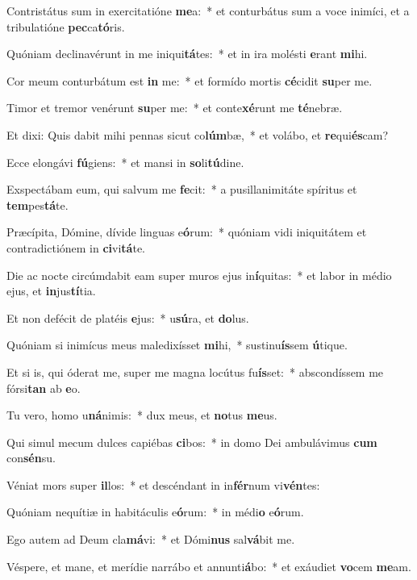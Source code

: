 \item Contristátus sum in exercitatióne \textbf{me}a:~* et conturbátus sum a voce inimíci, et a tribulatióne \textbf{pec}ca\textbf{tó}ris.
\item Quóniam declinavérunt in me iniqui\textbf{tá}tes:~* et in ira molésti \textbf{e}rant \textbf{mi}hi.
\item Cor meum conturbátum est \textbf{in} me:~* et formído mortis \textbf{cé}cidit \textbf{su}per me.
\item Timor et tremor venérunt \textbf{su}per me:~* et conte\textbf{xé}runt me \textbf{té}nebræ.
\item Et dixi: Quis dabit mihi pennas sicut co\textbf{lúm}bæ,~* et volábo, et \textbf{re}qui\textbf{és}cam?
\item Ecce elongávi \textbf{fú}giens:~* et mansi in \textbf{so}li\textbf{tú}dine.
\item Exspectábam eum, qui salvum me \textbf{fe}cit:~* a pusillanimitáte spíritus et \textbf{tem}pes\textbf{tá}te.
\item Præcípita, Dómine, dívide linguas e\textbf{ó}rum:~* quóniam vidi iniquitátem et contradictiónem in \textbf{ci}vi\textbf{tá}te.
\item Die ac nocte circúmdabit eam super muros ejus in\textbf{í}quitas:~* et labor in médio ejus, et \textbf{in}jus\textbf{tí}tia.
\item Et non defécit de platéis \textbf{e}jus:~* u\textbf{sú}ra, et \textbf{do}lus.
\item Quóniam si inimícus meus maledixísset \textbf{mi}hi,~* sustinu\textbf{ís}sem \textbf{ú}tique.
\item Et si is, qui óderat me, super me magna locútus fu\textbf{ís}set:~* abscondíssem me fórsi\textbf{tan} ab \textbf{e}o.
\item Tu vero, homo u\textbf{ná}nimis:~* dux meus, et \textbf{no}tus \textbf{me}us.
\item Qui simul mecum dulces capiébas \textbf{ci}bos:~* in domo Dei ambulávimus \textbf{cum} con\textbf{sén}su.
\item Véniat mors super \textbf{il}los:~* et descéndant in in\textbf{fér}num vi\textbf{vén}tes:
\item Quóniam nequítiæ in habitáculis e\textbf{ó}rum:~* in médi\textbf{o} e\textbf{ó}rum.
\item Ego autem ad Deum cla\textbf{má}vi:~* et Dómi\textbf{nus} sal\textbf{vá}bit me.
\item Véspere, et mane, et merídie narrábo et annunti\textbf{á}bo:~* et exáudiet \textbf{vo}cem \textbf{me}am.
